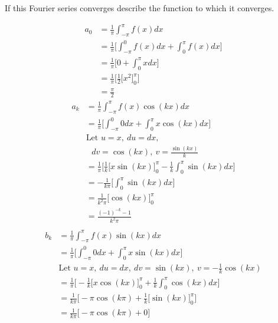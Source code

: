 \documentclass{article}
\begin{document}
\begin{enumerate}
\begin{enumerate}
If this Fourier series converges describe the function to which it converges.
        \begin{multicols}{2}
        \noindent
        \begin{align*}
            a_0 &= \frac{1}{\pi} \int_{-\pi}^{\pi}f(x) dx \\
            &= \frac{1}{\pi} \Bigg[\int_{-\pi}^{0}f(x) dx + \int_{0}^{\pi}f(x) dx \Bigg] \\
            &= \frac{1}{\pi} \Bigg[ 0 + \int_{0}^{\pi}x dx \Bigg] \\
            &= \frac{1}{\pi} \Bigg[\frac{1}{2}\Big[x^2\Big]_{0}^{\pi} \Bigg] \\
            &= \frac{\pi}{2}
        \end{align*}
        \begin{align*}
            a_k &= \frac{1}{\pi} \int_{-\pi}^{\pi}f(x)\cos(kx) dx \\
            &= \frac{1}{\pi} \Bigg[\int_{-\pi}^{0}0 dx + \int_{0}^{\pi}x\cos(kx) dx\Bigg] \\
            &\text{Let } u = x,\: du = dx,  \\
            & \: \: \:dv = \cos(kx),\: v = \frac{\sin(kx)}{k} \\
            &= \frac{1}{\pi} \Bigg[\frac{1}{k}\Big[x\sin(kx)\Big]^{\pi}_{0} - \frac{1}{k}\int_{0}^{\pi}\sin(kx) dx\Bigg] \\
            &= - \frac{1}{k\pi} \Bigg[\int_{0}^{\pi}\sin(kx) dx\Bigg] \\
            &= \frac{1}{k^2\pi} \Big[\cos(kx) \Big]_{0}^{\pi}\\
            &= \frac{(-1)^{-k} - 1}{k^2\pi} \\
        \end{align*}
        \begin{align*}
            b_k &= \frac{1}{\pi} \int_{-\pi}^{\pi}f(x)\sin(kx) dx \\
            &= \frac{1}{\pi} \Bigg[\int_{-\pi}^{0}0 dx +  \int_{0}^{\pi}x\sin(kx) dx \Bigg]\\
            &\text{Let } u = x,\: du = dx,\: dv = \sin(kx),\: v = -\frac{1}{k}\cos(kx) \\
            &= \frac{1}{\pi} \Bigg[-\frac{1}{k}\Big[x\cos(kx)\Big]^{\pi}_{0} + \frac{1}{k}\int_{0}^{\pi}\cos(kx) dx \Bigg]\\
            &= \frac{1}{k \pi} \Bigg[-\pi\cos(k\pi) + \frac{1}{k} \Big[ \sin(kx) \Big]_{0}^{\pi} \Bigg]\\
            &= \frac{1}{k \pi} \Bigg[-\pi\cos(k\pi) + 0 \Bigg]\\

\end{align*}
\end{multicols}
\end{enumerate}
\end{enumerate}
\end{document}
